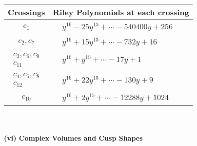 \documentclass[1p]{elsarticle_modified}
\theoremstyle{definition}
\begin{document}
\begin{tabular}{m{50pt}|m{274pt}}
Crossings & \hspace{64pt}Riley Polynomials at each crossing \\
\hline $$\begin{aligned}c_{1}\end{aligned}$$&$\begin{aligned}
&y^{16}-25 y^{15}+\cdots-540400 y+256
\end{aligned}$\\
\hline $$\begin{aligned}c_{2},c_{7}\end{aligned}$$&$\begin{aligned}
&y^{16}+15 y^{15}+\cdots-732 y+16
\end{aligned}$\\
\hline $$\begin{aligned}c_{3},c_{6},c_{9}\\c_{11}\end{aligned}$$&$\begin{aligned}
&y^{16}+y^{15}+\cdots-17 y+1
\end{aligned}$\\
\hline $$\begin{aligned}c_{4},c_{5},c_{8}\\c_{12}\end{aligned}$$&$\begin{aligned}
&y^{16}+22 y^{15}+\cdots-130 y+9
\end{aligned}$\\
\hline $$\begin{aligned}c_{10}\end{aligned}$$&$\begin{aligned}
&y^{16}+2 y^{15}+\cdots-12288 y+1024
\end{aligned}$\\
\hline
\end{tabular}\\~\\
\newpage\flushleft \textbf{(vi) Complex Volumes and Cusp Shapes}
\end{document}
